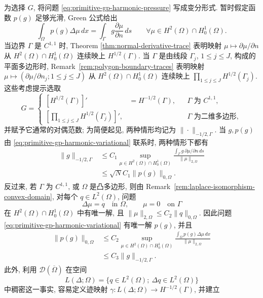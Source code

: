 为选择 $G$, 将问题 \eqref{eq:primitive-gp-harmonic-pressure} 写成变分形式.
暂时假定函数 $p(g)$ 足够光滑, Green 公式给出
\begin{equation}\label{eq:primitive-gp-harmonic-variational}
\int_\Omega p(g)\Delta\mu\,dx
=\int_\Gamma g\frac{\partial\mu}{\partial n}\,ds
\qquad\forall\mu\in H^2(\Omega)\cap H_0^1(\Omega).
\end{equation}
当边界 $\Gamma$ 是 $C^{1,1}$ 时, Theorem
\ref{thm:normal-derivative-trace} 表明映射
$\mu\mapsto\partial\mu/\partial n$ 从
$H^2(\Omega)\cap H_0^1(\Omega)$ 连续映上 $H^{1/2}(\Gamma)$.
当 $\Gamma$ 是由线段 $\Gamma_j$, $1\leq j\leq J$, 构成的平面多边形时,
Remark~\ref{rem:polygon-boundary-traces} 表明映射
$\mu\mapsto(\partial\mu/\partial n_j;1\leq j\leq J)$ 从
$H^2(\Omega)\cap H_0^1(\Omega)$ 连续映上
$\prod_{1\leq j\leq J}H^{1/2}(\Gamma_j)$. 这些考虑提示选取
\begin{equation}\label{eq:primitive-gp-boundary-space}
G=\left\{
\begin{aligned}
[H^{1/2}(\Gamma)]'&=H^{-1/2}(\Gamma),
&&\Gamma\text{ 为 }C^{1,1},\\
\left[\prod_{1\leq j\leq J}H^{1/2}(\Gamma_j)\right]',
&&&\Gamma\text{ 为二维多边形},
\end{aligned}
\right.
\end{equation}
并赋予它通常的对偶范数; 为简便起见, 两种情形均记为
$\|\cdot\|_{-1/2,\Gamma}$. 当 $g,p(g)$ 由
\eqref{eq:primitive-gp-harmonic-variational} 联系时, 两种情形下都有
\[
\begin{aligned}
\|g\|_{-1/2,\Gamma}
&\leq C_1\sup_{\mu\in H^2(\Omega)\cap H_0^1(\Omega)}
\frac{\int_\Gamma g\,\partial\mu/\partial n\,ds}{\|\mu\|_{2,\Omega}}\\
&\leq\sqrt N C_1\|p(g)\|_{0,\Omega}.
\end{aligned}
\]
反过来, 若 $\Gamma$ 为 $C^{1,1}$, 或 $\Omega$ 是凸多边形, 则由
Remark~\ref{rem:laplace-isomorphism-convex-domain}, 对每个 $q\in L^2(\Omega)$,
问题
\[
\Delta\mu=q\quad\text{in }\Omega,
\qquad\mu=0\quad\text{on }\Gamma
\]
在 $H^2(\Omega)\cap H_0^1(\Omega)$ 中有唯一解, 且
$\|\mu\|_{2,\Omega}\leq C_2\|q\|_{0,\Omega}$. 因此问题
\eqref{eq:primitive-gp-harmonic-variational} 有唯一解 $p(g)$, 并且
\[
\begin{aligned}
\|p(g)\|_{0,\Omega}
&\leq C_2\sup_{\mu\in H^2(\Omega)\cap H_0^1(\Omega)}
\frac{\int_\Omega p(g)\Delta\mu\,dx}{\|\mu\|_{2,\Omega}}\\
&\leq C_3\|g\|_{-1/2,\Gamma}.
\end{aligned}
\]
此外, 利用 $\mathcal D(\overline\Omega)$ 在空间
\[
L(\Delta;\Omega)=\{q\in L^2(\Omega);\ \Delta q\in L^2(\Omega)\}
\]
中稠密这一事实, 容易定义迹映射
$\gamma:L(\Delta;\Omega)\to H^{-1/2}(\Gamma)$, 并建立

